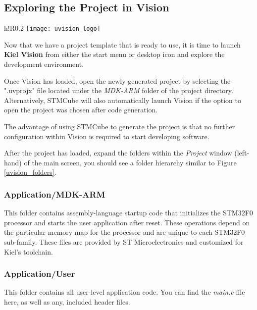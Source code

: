 \documentclass[11pt,fleqn]{book} %
\begin{document}
\subsection{Exploring the Project in {\textmu}Vision}

    \begin{wrapfigure}[8]{h!R}{0.2\textwidth}
    \centering\texttt{[image: uvision\_logo]}
    \label{uvision_logo}
    \end{wrapfigure}

Now that we have a project template that is ready to use, it is time to launch \textbf{Kiel {\textmu}Vision} from either the start menu or desktop icon and explore the development environment. 

Once {\textmu}Vision has loaded, open the newly generated project by selecting the ".uvprojx" file located under the \textit{MDK-ARM} folder of the project directory. Alternatively, STMCube will also automatically launch {\textmu}Vision if the option to open the project was chosen after code generation. 

The advantage of using STMCube to generate the project is that no further configuration within {\textmu}Vision is required to start developing software. 

After the project has loaded, expand the folders within the \textit{Project} window (left-hand) of the main screen, you should see a folder hierarchy similar to Figure \vref{uvision_folders}.

\subsubsection*{Application/MDK-ARM}
This folder contains assembly-language startup code that initializes the STM32F0 processor and starts the user application after reset.  These operations depend on the particular memory map for the processor and are unique to each STM32F0 sub-family. These files are provided by ST Microelectronics and customized for Kiel's toolchain. 

\subsubsection*{Application/User}
This folder contains all user-level application code. You can find the \textit{main.c} file here, as well as any, included header files. 
\end{document}

